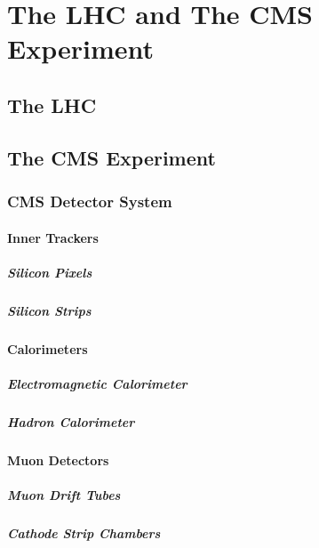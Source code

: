 \chapter{The LHC and The CMS Experiment}

\section{The LHC}

\section{The CMS Experiment}

\subsection{CMS Detector System}
\subsubsection{Inner Trackers}
\paragraph{Silicon Pixels}
\paragraph{Silicon Strips}

\subsubsection{Calorimeters}
\paragraph{Electromagnetic Calorimeter}
\paragraph{Hadron Calorimeter}

\subsubsection{Muon Detectors}
\paragraph{Muon Drift Tubes}
\paragraph{Cathode Strip Chambers}

